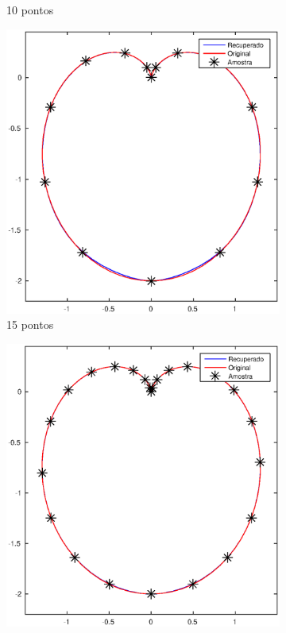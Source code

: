 \begin{figure}[htb]
\begin{subfigure}[b]{0.43\textwidth}
		\caption{10 pontos}
		\label{fig:ex14}
	\end{subfigure}
	\hfill
	\begin{subfigure}[b]{0.43\textwidth}
		\centering
		\includegraphics[width=\textwidth]{imagens/cap4/rep_1_15.eps}
		\caption{15 pontos}
		\label{fig:ex12}
	\end{subfigure}
	\hfill
	\begin{subfigure}[b]{0.43\textwidth}
		\centering
		\includegraphics[width=\textwidth]{imagens/cap4/rep_1_25.eps}

\end{subfigure}
\end{figure}
